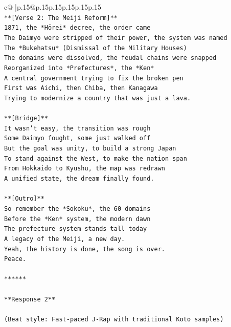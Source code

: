 \documentclass{article}
\begin{document}
{\begin{supertabular}{c@{$\;$}|p{.15\linewidth}@{}p{.15\linewidth}p{.15\linewidth}p{.15\linewidth}p{.15\linewidth}p{.15\linewidth}}
{{{\\ 
\texttt{**{[}Verse 2: The Meiji Reform{]}**} \\
\texttt{1871, the *Hōrei* decree, the order came} \\
\texttt{The Daimyo were stripped of their power, the system was named} \\
\texttt{The *Bukehatsu* (Dismissal of the Military Houses)} \\
\texttt{The domains were dissolved, the feudal chains were snapped} \\
\texttt{Reorganized into *Prefectures*, the *Ken*} \\
\texttt{A central government trying to fix the broken pen} \\
\texttt{First was Aichi, then Chiba, then Kanagawa} \\
\texttt{Trying to modernize a country that was just a lava.} \\
\\ 
\texttt{**{[}Bridge{]}**} \\
\texttt{It wasn't easy, the transition was rough} \\
\texttt{Some Daimyo fought, some just walked off} \\
\texttt{But the goal was unity, to build a strong Japan} \\
\texttt{To stand against the West, to make the nation span} \\
\texttt{From Hokkaido to Kyushu, the map was redrawn} \\
\texttt{A unified state, the dream finally found.} \\
\\ 
\texttt{**{[}Outro{]}**} \\
\texttt{So remember the *Sokoku*, the 60 domains} \\
\texttt{Before the *Ken* system, the modern dawn} \\
\texttt{The prefecture system stands tall today} \\
\texttt{A legacy of the Meiji, a new day.} \\
\texttt{Yeah, the history is done, the song is over.} \\
\texttt{Peace.} \\
\\ 
\texttt{******} \\
\\ 
\texttt{**Response 2**} \\
\\ 
\texttt{(Beat style: Fast{-}paced J{-}Rap with traditional Koto samples)} \\
}}}
\end{supertabular}}
\end{document}
